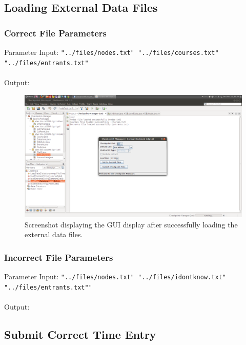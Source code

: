 \documentclass[a4paper, 10pt]{article}
\begin{document}
\subsection{Loading External Data Files}

\subsubsection{Correct File Parameters}

Parameter Input: \verb+"../files/nodes.txt" "../files/courses.txt" "../files/entrants.txt"+ \\\\
Output:


\begin{figure}[ht!]
\centering
\includegraphics[scale=0.3]{cm-loadsuccess.png}
\caption{Screenshot displaying the GUI display after successfully loading the external data files.}
\end{figure}

\clearpage
\subsubsection{Incorrect File Parameters}

Parameter Input: \verb+"../files/nodes.txt" "../files/idontknow.txt" "../files/entrants.txt""+ \\\\
Output:


\subsection{Submit Correct Time Entry}
\end{document}
